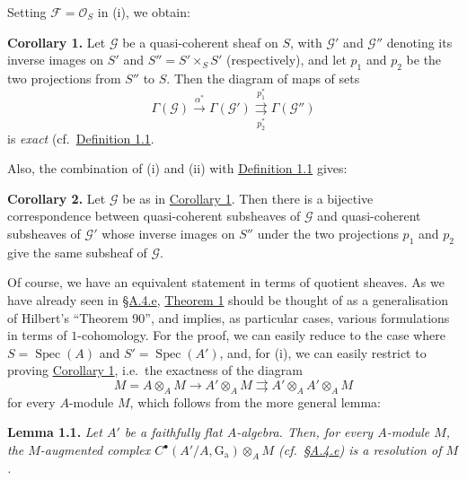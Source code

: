 \documentclass{article}
\newenvironment{itenv}[1]
  {\phantomsection\par\smallskip\noindent\textbf{#1.}\itshape}
  {\par\smallskip}
\newenvironment{rmenv}[1]
  {\phantomsection\par\smallskip\noindent\textbf{#1.}\rmfamily}
  {\par\smallskip}
\newcommand{\oldpage}[1]{\marginpar{\footnotesize$\Big\vert$ \textit{p.~#1}}}
\theoremstyle{definition}
\theoremstyle{definition}
\theoremstyle{definition}
\theoremstyle{definition}
\theoremstyle{remark}
\begin{document}
Setting \({\mathcal{F}}={\mathscr{O}}_S\) in (i), we obtain:

\leavevmode{}%
\begin{rmenv}{Corollary 1}
Let \({\mathscr{G}}\) be a quasi-coherent sheaf on \(S\), with \({\mathscr{G}}'\) and \({\mathscr{G}}''\) denoting its inverse images on \(S'\) and \(S''=S'\times_S S'\) (respectively), and let \(p_1\) and \(p_2\) be the two projections from \(S''\) to \(S\).
\oldpage{190-18}Then the diagram of maps of sets
\[
  \Gamma({\mathscr{G}}) \xrightarrow{\alpha^*}
  \Gamma({\mathscr{G}}') \overset{p_1^*}{\underset{p_2^*}{\rightrightarrows}}
  \Gamma({\mathscr{G}}'')
\]
is \emph{exact} (cf.~\protect\hyperlink{fga-3-i-section-A.1-definition-1.1}{Definition 1.1}.

\end{rmenv}

Also, the combination of (i) and (ii) with \protect\hyperlink{fga-3-i-section-A.1-definition-1.1}{Definition 1.1} gives:

\leavevmode{}%
\begin{rmenv}{Corollary 2}
Let \({\mathscr{G}}\) be as in \protect\hyperlink{fga-3-i-section-B.1-corollary-1}{Corollary 1}.
Then there is a bijective correspondence between quasi-coherent subsheaves of \({\mathscr{G}}\) and quasi-coherent subsheaves of \({\mathscr{G}}'\) whose inverse images on \(S''\) under the two projections \(p_1\) and \(p_2\) give the same subsheaf of \({\mathscr{G}}\).

\end{rmenv}

Of course, we have an equivalent statement in terms of quotient sheaves.
As we have already seen in \protect\hyperlink{fga-3-i-section-A.4.e}{§A.4.e}, \protect\hyperlink{fga-3-i-section-B.1-theorem-1}{Theorem 1} should be thought of as a generalisation of Hilbert's ``Theorem 90'', and implies, as particular cases, various formulations in terms of \(1\)-cohomology.
For the proof, we can easily reduce to the case where \(S=\operatorname{Spec}(A)\) and \(S'=\operatorname{Spec}(A')\), and, for (i), we can easily restrict to proving \protect\hyperlink{fga-3-i-section-B.1-corollary-1}{Corollary 1}, i.e.~the exactness of the diagram
\[
  M = A\otimes_A M \to
  A'\otimes_A M \rightrightarrows
  A'\otimes_A A'\otimes_A M
\]
for every \(A\)-module \(M\), which follows from the more general lemma:

\leavevmode{}%
\begin{itenv}{Lemma 1.1}
Let \(A'\) be a faithfully flat \(A\)-algebra.
Then, for every \(A\)-module \(M\), the \(M\)-augmented complex \(C^\bullet(A'/A,\operatorname{G_a})\otimes_A M\) (cf.~\protect\hyperlink{fga-3-i-section-A.4.e}{§A.4.e}) is a \emph{resolution} of \(M\).

\end{itenv}
\end{document}

